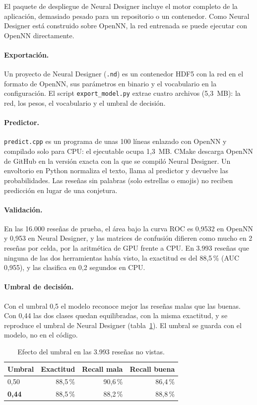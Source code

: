 \documentclass[11pt,a4paper]{article}
\newcommand{\pct}[1]{#1\,\%}
\newcommand{\code}[1]{\texttt{\small #1}}
\begin{document}
El paquete de despliegue de Neural Designer incluye el motor completo de la aplicación, demasiado pesado para un
repositorio o un contenedor. Como Neural Designer está construido sobre OpenNN, la red entrenada se puede ejecutar
con OpenNN directamente.

\paragraph{Exportación.} Un proyecto de Neural Designer (\code{.nd}) es un contenedor HDF5 con la red en el formato
de OpenNN, sus parámetros en binario y el vocabulario en la configuración. El script \code{export\_model.py} extrae
cuatro archivos (5,3~MB): la red, los pesos, el vocabulario y el umbral de decisión.

\paragraph{Predictor.} \code{predict.cpp} es un programa de unas 100 líneas enlazado con OpenNN y compilado solo para
CPU: el ejecutable ocupa 1,3~MB. CMake descarga OpenNN de GitHub en la versión exacta con la que se compiló Neural
Designer. Un envoltorio en Python normaliza el texto, llama al predictor y devuelve las probabilidades. Las reseñas
sin palabras (solo estrellas o emojis) no reciben predicción en lugar de una conjetura.

\paragraph{Validación.} En las 16.000 reseñas de prueba, el área bajo la curva ROC es 0,9532 en OpenNN y 0,953 en
Neural Designer, y las matrices de confusión difieren como mucho en 2 reseñas por celda, por la aritmética de GPU
frente a CPU. En 3.993 reseñas que ninguna de las dos herramientas había visto, la exactitud es del \pct{88,5}
(AUC 0,955), y las clasifica en 0,2 segundos en CPU.

\paragraph{Umbral de decisión.} Con el umbral 0,5 el modelo reconoce mejor las reseñas malas que las buenas. Con
0,44 las dos clases quedan equilibradas, con la misma exactitud, y se reproduce el umbral de Neural Designer
(tabla~\ref{tab:umbral}). El umbral se guarda con el modelo, no en el código.

\begin{table}[htbp]
\centering\small
\caption{Efecto del umbral en las 3.993 reseñas no vistas.}
\label{tab:umbral}
\begin{tabular}{@{}lrrr@{}}
\toprule
Umbral & Exactitud & Recall mala & Recall buena \\
\midrule
0,50 & \pct{88,5} & \pct{90,6} & \pct{86,4} \\
\textbf{0,44} & \pct{88,5} & \pct{88,2} & \pct{88,8} \\
\bottomrule
\end{tabular}
\end{table}
\end{document}
